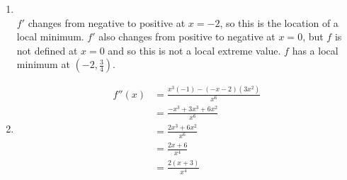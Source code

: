 \documentclass{ximera}
\begin{document}
\begin{problem}
\begin{explanation}
\begin{enumerate}
       To find where $f'$ is positive and where $f'$ is negative, we need to find where $f'(x) = 0$ and where $f'(x)$ does not exist.
       Clearly, $f'(x)$ does not exist when $x=0$.
       To find when $f'(x) = 0$, we solve:
       \begin{align*}
         \frac{-x-2}{x^3} = 0 &\implies -x-2 = 0 \\
         &\implies -x = 2\\
         &\implies x = -2
       \end{align*}
       Since $x=0$ is not in the domain of $f$, $x=-2$ is the only critical point of $f$.
       To see where $f$ is increasing and decreasing, consider the following sign chart for $f'$:
       \begin{center}
         \begin{image}
         \end{image}
       \end{center}

       So we see that $f$ is increasing on $(-2,0)$, and $f$ is decreasing on $(-\infty, -2)$ and $(0,\infty)$.
       
     \item
         \\
       $f'$ changes from negative to positive at $x=-2$, so this is the location of a local minimum.
       $f'$ also changes from positive to negative at $x=0$, but $f$ is not defined at $x=0$ and so this is not a local extreme value.
       $f$ has a local minimum at $\left( -2,\frac{3}{4} \right)$.
			
			
			
     \item
       \begin{align*}
         f''(x) &= \frac{x^3(-1) - (-x-2)(3x^2)}{x^6} \\
                &= \frac{-x^3 + 3x^3 + 6x^2}{x^6} \\
		&= \frac{2x^3 + 6x^2}{x^6} \\
		&= \frac{2x+6}{x^4} \\
		&= \frac{2(x+3)}{x^4}
       \end{align*}
			

\end{enumerate}
\end{explanation}
\end{problem}
\end{document}
